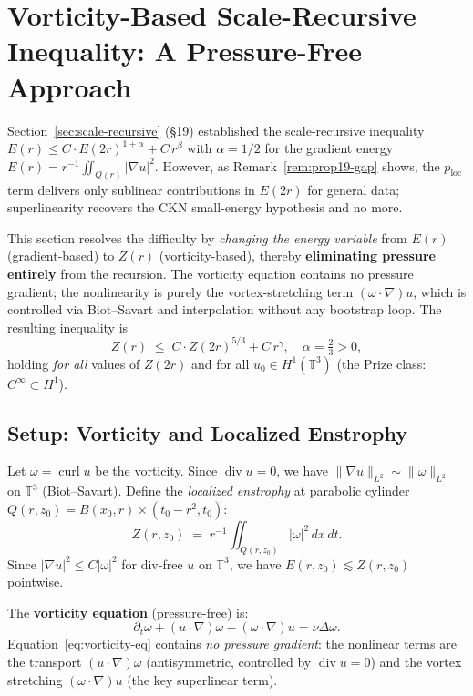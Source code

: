 \documentclass[11pt]{article}
\theoremstyle{definition}
\theoremstyle{remark}
\newcommand{\T}{\mathbb{T}}
\newcommand{\divg}{\operatorname{div}}
\newcommand{\curl}{\operatorname{curl}}
\begin{document}
\section{Vorticity-Based Scale-Recursive Inequality: A Pressure-Free Approach}
\label{sec:vorticity-recursive}

\noindent
Section~\ref{sec:scale-recursive} (§19) established the scale-recursive
inequality $E(r)\leq C\cdot E(2r)^{1+\alpha}+C\,r^\beta$ with $\alpha=1/2$ for
the gradient energy $E(r)=r^{-1}\iint_{Q(r)}|\nabla u|^2$.  However, as
Remark~\ref{rem:prop19-gap} shows, the $p_{\mathrm{loc}}$ term delivers only
sublinear contributions in $E(2r)$ for general data; superlinearity recovers
the CKN small-energy hypothesis and no more.

This section resolves the difficulty by \emph{changing the energy variable} from
$E(r)$ (gradient-based) to $Z(r)$ (vorticity-based), thereby
\textbf{eliminating pressure entirely} from the recursion.  The vorticity equation
contains no pressure gradient; the nonlinearity is purely the vortex-stretching
term $(\omega\cdot\nabla)u$, which is controlled via Biot--Savart and interpolation
without any bootstrap loop.  The resulting inequality is
\[
  Z(r)\;\leq\; C\cdot Z(2r)^{5/3}+C\,r^\gamma, \quad \alpha = \tfrac{2}{3} > 0,
\]
holding \emph{for all} values of $Z(2r)$ and for all $u_0\in H^1(\T^3)$
(the Prize class: $C^\infty\subset H^1$).

\subsection{Setup: Vorticity and Localized Enstrophy}

Let $\omega = \curl u$ be the vorticity.  Since $\divg u=0$, we have
$\|\nabla u\|_{L^2}\sim\|\omega\|_{L^2}$ on $\T^3$ (Biot--Savart).
Define the \emph{localized enstrophy} at parabolic cylinder
$Q(r,z_0)=B(x_0,r)\times(t_0-r^2,t_0)$:
\begin{equation}\label{eq:Z-def}
  Z(r,z_0) \;=\; r^{-1}\iint_{Q(r,z_0)}|\omega|^2\,dx\,dt.
\end{equation}
Since $|\nabla u|^2\leq C|\omega|^2$ for div-free $u$ on $\T^3$, we have
$E(r,z_0)\lesssim Z(r,z_0)$ pointwise.

The \textbf{vorticity equation} (pressure-free) is:
\begin{equation}\label{eq:vorticity-eq}
  \partial_t\omega + (u\cdot\nabla)\omega - (\omega\cdot\nabla)u = \nu\Delta\omega.
\end{equation}
Equation~\eqref{eq:vorticity-eq} contains \emph{no pressure gradient}: the
nonlinear terms are the transport $(u\cdot\nabla)\omega$ (antisymmetric,
controlled by $\divg u=0$) and the vortex stretching $(\omega\cdot\nabla)u$
(the key superlinear term).
\end{document}
